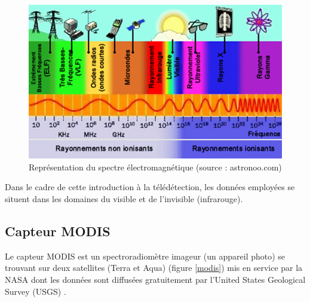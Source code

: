 \documentclass[10pt,a4paper]{article}
\begin{document}
\begin{figure}[!h]
\centering
\includegraphics[scale=0.6]{img/spectre-electromagnetique.png}
\caption{Représentation du spectre électromagnétique (source : astronoo.com)}
\label{spectreElectro}
\end{figure}

Dans le cadre de cette introduction à la télédétection, les données employées se situent dans les domaines du visible et de l'invisible (infrarouge).

\subsection{Capteur MODIS}

Le capteur MODIS est un spectroradiomètre imageur (un appareil photo) se trouvant sur deux satellites (Terra et Aqua) (figure \ref{modis}) mis en service par la NASA dont les données sont diffusées gratuitement par l'United States Geological Survey (USGS) .
\end{document}
